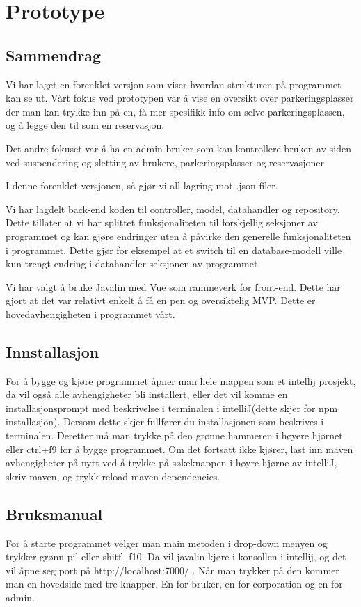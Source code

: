 \documentclass[12pt]{article}
\begin{document}
\section{Prototype}

    \subsection{Sammendrag}
    Vi har laget en forenklet versjon som viser hvordan strukturen på programmet kan se ut. Vårt fokus ved prototypen var å vise en oversikt over parkeringsplasser der man kan trykke inn på en, få mer spesifikk info om selve parkeringsplassen, og å legge den til som en reservasjon. 

    Det andre fokuset var å ha en admin bruker som kan kontrollere bruken av siden ved suspendering og sletting av brukere, parkeringsplasser og reservasjoner

    I denne forenklet versjonen, så gjør vi all lagring mot .json filer.

    Vi har lagdelt back-end koden til controller, model, datahandler og repository. Dette tillater at vi har splittet funksjonaliteten til forskjellig seksjoner av programmet og kan gjøre endringer uten å påvirke den generelle funksjonaliteten i programmet. Dette gjør for eksempel at et switch til en database-modell ville kun trengt endring i datahandler seksjonen av programmet.

    Vi har valgt å bruke Javalin med Vue som rammeverk for front-end. Dette har gjort at det var relativt enkelt å få en pen og oversiktelig MVP. Dette er hovedavhengigheten i programmet vårt.

    \subsection{Innstallasjon}
    For å bygge og kjøre programmet åpner man hele mappen som et intellij prosjekt, da vil også alle avhengigheter bli installert, eller det vil komme en installasjonsprompt med beskrivelse i terminalen i  intelliJ(dette skjer for npm installasjon). Dersom dette skjer fullfører du installasjonen som beskrives i terminalen. Deretter må man trykke på den grønne hammeren i høyere hjørnet eller ctrl+f9 for å bygge programmet. Om det fortsatt ikke kjører, last inn maven avhengigheter på nytt ved å trykke på søkeknappen i høyre hjørne av intelliJ, skriv maven, og trykk reload maven dependencies.
    \subsection{Bruksmanual}
    For å starte programmet velger man main metoden i drop-down menyen og trykker grønn pil eller shitf+f10. Da vil javalin kjøre i konsollen i intellij, og det vil åpne seg port på http://localhost:7000/ . Når man trykker på den kommer man en hovedside med tre knapper. En for bruker, en for corporation og en for admin.
    
\end{document}
